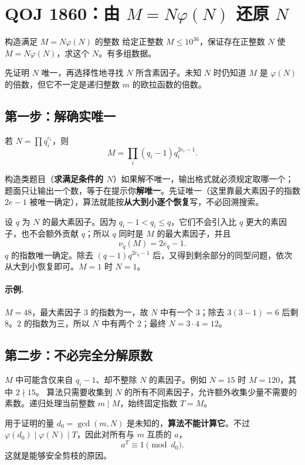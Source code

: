 
\section{QOJ 1860：由 \texorpdfstring{$M=N\varphi(N)$}{M=Nphi(N)} 还原 \texorpdfstring{$N$}{N}}
\begin{problem}{构造满足 $M=N\varphi(N)$ 的整数}
给定正整数 $M\le10^{36}$，保证存在正整数 $N$ 使 $M=N\varphi(N)$，求这个 $N$。有多组数据。
\end{problem}
\hint 先证明 $N$ 唯一，再选择性地寻找 $N$ 所含素因子。未知 $N$ 时仍知道 $M$ 是 $\varphi(N)$ 的倍数，但它不一定是递归整数 $m$ 的欧拉函数的倍数。


\subsection{第一步：解确实唯一}
若 $N=\prod q_i^{e_i}$，则
\[
 M=\prod_i(q_i-1)q_i^{2e_i-1}.
\]

\begin{tip}[为什么要先证唯一性]
构造类题目（\textbf{求满足条件的 $N$}）如果解不唯一，输出格式就必须规定取哪一个；题面只让输出一个数，等于在提示你\textbf{解唯一}。先证唯一（这里靠最大素因子的指数 $2e-1$ 被唯一确定），算法就能按\textbf{从大到小逐个恢复}写，不必回溯搜索。
\end{tip}

设 $q$ 为 $N$ 的最大素因子。因为 $q_i-1<q_i\le q$，它们不会引入比 $q$ 更大的素因子，也不会额外贡献 $q$；所以 $q$ 同时是 $M$ 的最大素因子，并且
\[
 \nu_q(M)=2e_q-1.
\]
$q$ 的指数唯一确定。除去 $(q-1)q^{2e_q-1}$ 后，又得到剩余部分的同型问题，依次从大到小恢复即可。$M=1$ 时 $N=1$。

\paragraph{示例.} $M=48$，最大素因子 $3$ 的指数为一，故 $N$ 中有一个 $3$；除去 $3(3-1)=6$ 后剩 $8$。$2$ 的指数为三，所以 $N$ 中有两个 $2$；最终 $N=3\cdot4=12$。

\subsection{第二步：不必完全分解原数}
$M$ 中可能含仅来自 $q_i-1$、却不整除 $N$ 的素因子。例如 $N=15$ 时 $M=120$，其中 $2\nmid15$。
算法只需要收集到 $N$ 的所有不同素因子，允许额外收集少量不需要的素数。递归处理当前整数 $m\mid M$，始终固定指数 $T=M$。

用于证明的量 $d_0=\gcd(m,N)$ 是未知的，\textbf{算法不能计算它}。不过 $\varphi(d_0)\mid\varphi(N)\mid T$，因此对所有与 $m$ 互质的 $a$，
\[
 a^T\equiv1\pmod{d_0}.
\]
这就是能够安全剪枝的原因。

